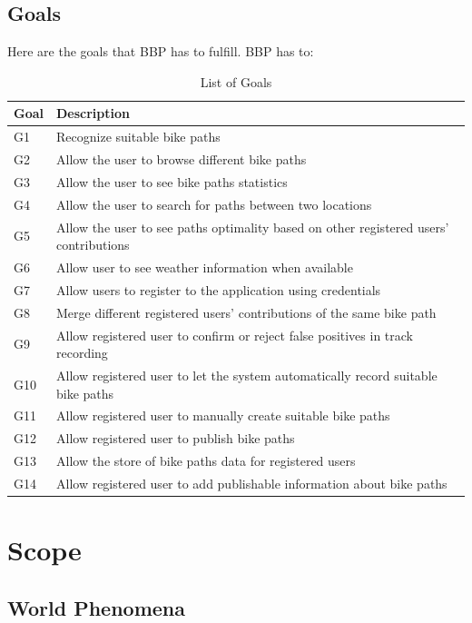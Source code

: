 \subsection{Goals}
Here are the goals that BBP has to fulfill. BBP has to:
\begin{table}[H]
\centering
\begin{tabularx}{\linewidth}{|l|X|}
\hline
\textbf{Goal} & \textbf{Description} \\ \hline
G1 & Recognize suitable bike paths \\ \hline
G2 & Allow the user to browse different bike paths \\ \hline
G3 & Allow the user to see bike paths statistics \\ \hline
G4 & Allow the user to search for paths between two locations \\ \hline
G5 & Allow the user to see paths optimality based on other registered users' contributions \\ \hline
G6 & Allow user to see weather information when available \\ \hline
G7 & Allow users to register to the application using credentials \\ \hline
G8 & Merge different registered users' contributions of the same bike path \\ \hline
G9 & Allow registered user to confirm or reject false positives in track recording \\ \hline
G10 & Allow registered user to let the system automatically record suitable bike paths \\ \hline
G11 & Allow registered user to manually create suitable bike paths \\ \hline
G12 & Allow registered user to publish bike paths \\ \hline
G13 & Allow the store of bike paths data for registered users \\ \hline
G14 & Allow registered user to add publishable information about bike paths \\ \hline
\end{tabularx}
\caption{List of Goals}
\label{tab:goals}
\end{table}

\section{Scope}
\subsection{World Phenomena}

